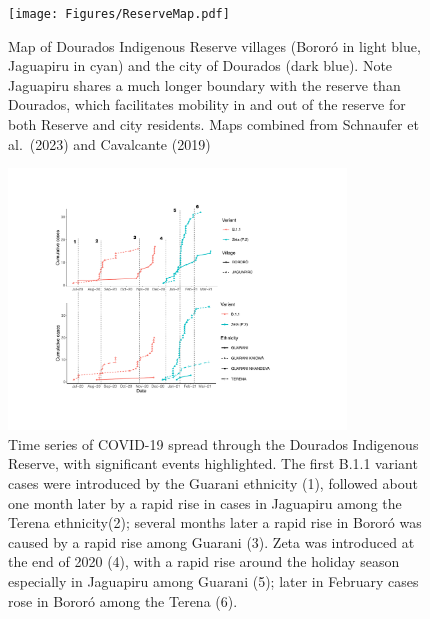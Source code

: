 \documentclass[
  letterpaper,
  abstract]{scrartcl}
\begin{document}
\begin{figure}[H]

{\centering \texttt{[image: Figures/ReserveMap.pdf]}

}

\caption{Map of Dourados Indigenous Reserve villages (Bororó in light
blue, Jaguapiru in cyan) and the city of Dourados (dark blue). Note
Jaguapiru shares a much longer boundary with the reserve than Dourados,
which facilitates mobility in and out of the reserve for both Reserve
and city residents. Maps combined from Schnaufer et al.~(2023) and
Cavalcante (2019)}

\end{figure}%
\begin{figure}[H]

{\centering \includegraphics[width=0.8\textwidth,height=\textheight]{Figures/Time Series.pdf}

}

\caption{Time series of COVID-19 spread through the Dourados Indigenous
Reserve, with significant events highlighted. The first B.1.1 variant
cases were introduced by the Guarani ethnicity (1), followed about one
month later by a rapid rise in cases in Jaguapiru among the Terena
ethnicity(2); several months later a rapid rise in Bororó was caused by
a rapid rise among Guarani (3). Zeta was introduced at the end of 2020
(4), with a rapid rise around the holiday season especially in Jaguapiru
among Guarani (5); later in February cases rose in Bororó among the
Terena (6).}

\end{figure}%
\end{document}
